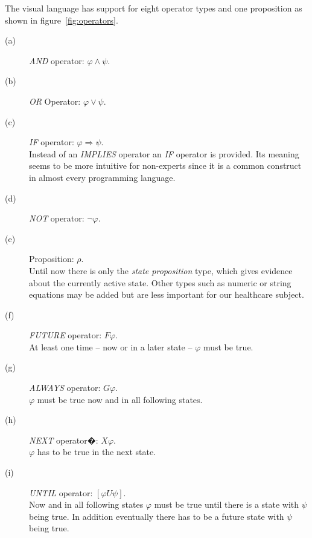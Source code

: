 \documentclass[conference]{IEEEtran}
\begin{document}
The visual language has support for eight operator types and one proposition as shown in figure~\ref{fig:operators}. 

\begin{description}
	\item[(a)] \emph{AND} operator: $\varphi \wedge \psi$.
	\item[(b)] \emph{OR} Operator: $\varphi \vee \psi$.
	\item[(c)] \emph{IF} operator: $\varphi \Rightarrow \psi$.\\Instead of an \emph{IMPLIES} operator an \emph{IF} operator is provided. Its meaning seems to be more intuitive for non-experts since it is a common construct in almost every programming language.
	\item[(d)] \emph{NOT} operator: $\neg \varphi$.
	\item[(e)] Proposition: $\rho$.\\Until now there is only the \emph{state proposition} type, which gives evidence about the currently active state. Other types such as numeric or string equations may be added but are less important for our healthcare subject.
	\item[(f)] \emph{FUTURE} operator: $F \varphi$.\\At least one time -- now or in a later state -- $\varphi$ must be true.
	\item[(g)] \emph{ALWAYS} operator: $G \varphi$.\\$\varphi$ must be true now and in all following states.
	\item[(h)] \emph{NEXT} operator�: $X \varphi$.\\$\varphi$ has to be true in the next state.
	\item[(i)] \emph{UNTIL} operator: $[\varphi U \psi]$.\\Now and in all following states $\varphi$ must be true until there is a state with $\psi$ being true. In addition eventually there has to be a future state with $\psi$ being true.
\end{description}
\end{document}
